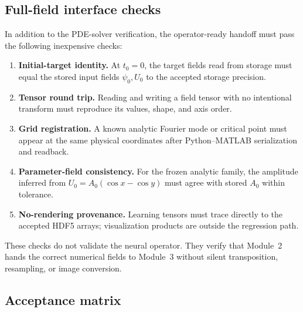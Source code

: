 \documentclass[11pt]{article}
\begin{document}
\subsection{Full-field interface checks}

In addition to the PDE-solver verification, the operator-ready handoff must pass the following inexpensive checks:
\begin{enumerate}[label=\arabic*.]
  \item \textbf{Initial-target identity.} At $t_0=0$, the target fields read from storage must equal the stored input fields $\psi_0,U_0$ to the accepted storage precision.
  \item \textbf{Tensor round trip.} Reading and writing a field tensor with no intentional transform must reproduce its values, shape, and axis order.
  \item \textbf{Grid registration.} A known analytic Fourier mode or critical point must appear at the same physical coordinates after Python--MATLAB serialization and readback.
  \item \textbf{Parameter-field consistency.} For the frozen analytic family, the amplitude inferred from $U_0=A_0(\cos x-\cos y)$ must agree with stored $A_0$ within tolerance.
  \item \textbf{No-rendering provenance.} Learning tensors must trace directly to the accepted HDF5 arrays; visualization products are outside the regression path.
\end{enumerate}
These checks do not validate the neural operator. They verify that Module~2 hands the correct numerical fields to Module~3 without silent transposition, resampling, or image conversion.

\subsection{Acceptance matrix}
\end{document}
